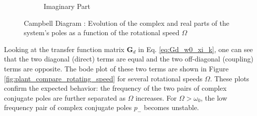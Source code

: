 \documentclass[10pt]{iopart}
\begin{document}
\begin{figure}[htbp]
\begin{subfigure}[c]{0.48\linewidth}
\caption{\label{fig:campbell_diagram_imag} Imaginary Part}
\end{subfigure}
\hfill
\caption{\label{fig:campbell_diagram}Campbell Diagram : Evolution of the complex and real parts of the system's poles as a function of the rotational speed \(\Omega\)}
\centering
\end{figure}

Looking at the transfer function matrix \(\bm{G}_d\) in Eq. \eqref{eq:Gd_w0_xi_k}, one can see that the two diagonal (direct) terms are equal and the two off-diagonal (coupling) terms are opposite.
The bode plot of these two terms are shown in Figure \ref{fig:plant_compare_rotating_speed} for several rotational speeds \(\Omega\).
These plots confirm the expected behavior: the frequency of the two pairs of complex conjugate poles are further separated as \(\Omega\) increases.
For \(\Omega > \omega_0\), the low frequency pair of complex conjugate poles \(p_{-}\) becomes unstable.
\end{document}
